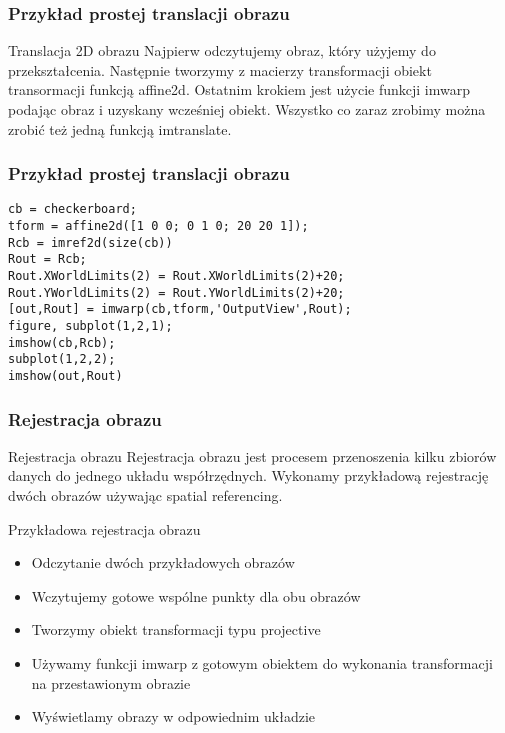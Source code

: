 \documentclass{beamer}
\begin{document}
\begin{frame}[fragile]
\frametitle{Przykład prostej translacji obrazu}
\begin{block}{Translacja 2D obrazu}
Najpierw odczytujemy obraz, który użyjemy do przekształcenia. Następnie tworzymy z macierzy transformacji obiekt transormacji funkcją affine2d. Ostatnim krokiem jest użycie funkcji imwarp podając obraz i uzyskany wcześniej obiekt.
Wszystko co zaraz zrobimy można zrobić też jedną funkcją imtranslate.
\end{block}

\end{frame}

\begin{frame}[fragile]
\frametitle{Przykład prostej translacji obrazu}
\begin{example}
\begin{lstlisting}
cb = checkerboard;
tform = affine2d([1 0 0; 0 1 0; 20 20 1]);
Rcb = imref2d(size(cb))
Rout = Rcb;
Rout.XWorldLimits(2) = Rout.XWorldLimits(2)+20;
Rout.YWorldLimits(2) = Rout.YWorldLimits(2)+20;
[out,Rout] = imwarp(cb,tform,'OutputView',Rout);
figure, subplot(1,2,1);
imshow(cb,Rcb);
subplot(1,2,2);
imshow(out,Rout)
\end{lstlisting}
\end{example}
\end{frame}

\begin{frame}
\frametitle{Rejestracja obrazu}
\begin{block}{Rejestracja obrazu}
Rejestracja obrazu jest procesem przenoszenia kilku zbiorów danych do jednego układu współrzędnych.
Wykonamy przykładową rejestrację dwóch obrazów używając spatial referencing.
\end{block}
\end{frame}

\begin{frame}{Przykładowa rejestracja obrazu}

\begin{itemize}
	\item Odczytanie dwóch przykładowych obrazów
	\item Wczytujemy gotowe wspólne punkty dla obu obrazów
	\item Tworzymy obiekt transformacji typu projective
	\item Używamy funkcji imwarp z gotowym obiektem do wykonania transformacji na przestawionym obrazie
	\item Wyświetlamy obrazy w odpowiednim układzie
\end{itemize}

\end{frame}
\end{document}

